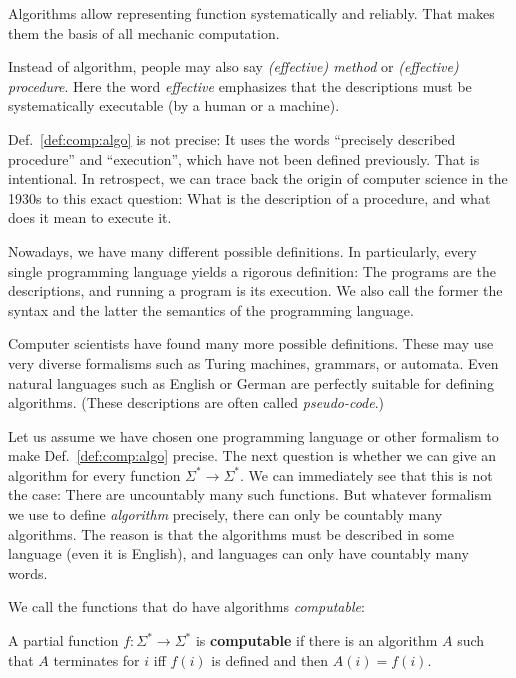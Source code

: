 Algorithms allow representing function systematically and reliably.
That makes them the basis of all mechanic computation.

\begin{terminology}
Instead of algorithm, people may also say \emph{(effective) method} or \emph{(effective) procedure}.
Here the word \emph{effective} emphasizes that the descriptions must be systematically executable (by a human or a machine).
\end{terminology}
 
\begin{remark}
Def.~\ref{def:comp:algo} is not precise: It uses the words ``precisely described procedure'' and ``execution'', which have not been defined previously.
That is intentional.
In retrospect, we can trace back the origin of computer science in the 1930s to this exact question: What is the description of a procedure, and what does it mean to execute it.

Nowadays, we have many different possible definitions.
In particularly, every single programming language yields a rigorous definition: The programs are the descriptions, and running a program is its execution.
We also call the former the syntax and the latter the semantics of the programming language.

Computer scientists have found many more possible definitions.
These may use very diverse formalisms such as Turing machines, grammars, or automata.
Even natural languages such as English or German are perfectly suitable for defining algorithms. (These descriptions are often called \emph{pseudo-code}.)
\end{remark}

Let us assume we have chosen one programming language or other formalism to make Def.~\ref{def:comp:algo} precise.
The next question is whether we can give an algorithm for every function $\Sigma^*\to \Sigma^*$.
We can immediately see that this is not the case: There are uncountably many such functions.
But whatever formalism we use to define \emph{algorithm} precisely, there can only be countably many algorithms.
The reason is that the algorithms must be described in some language (even it is English), and languages can only have countably many words.

We call the functions that do have algorithms \emph{computable}:

\begin{definition}\label{def:comp:comp}
A partial function $f:\Sigma^*\to\Sigma^*$ is \textbf{computable} if there is an algorithm $A$ such that $A$ terminates for $i$ iff $f(i)$ is defined and then $A(i)=f(i)$.
\end{definition}


